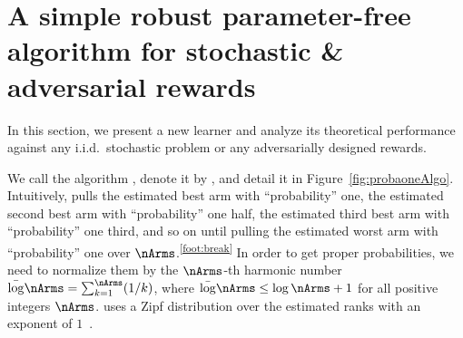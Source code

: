 %
\section{A simple robust parameter-free algorithm for stochastic \& adversarial rewards}
\label{s:UpperBOB}
%
In this section, we present a new learner 
and analyze its theoretical performance against any i.i.d.\, stochastic 
problem or any adversarially designed rewards.

We call the algorithm \ProbabilityONE{}, denote it by \Pone{}, %
and detail it in Figure~\ref{fig:probaoneAlgo}.
Intuitively,  \Pone{} pulls the estimated best arm with 
``probability'' one, the estimated second best arm with ``probability'' 
one half, the estimated third best arm with ``probability'' one 
third, and so on until pulling the estimated worst arm with ``probability'' one over $\nArms$.\textsuperscript{\ref{foot:break}} 
In order to get proper probabilities, we need to normalize  
them by the $\nArms$-th harmonic number %
$\bar\log \nArms =\sum_{k=1}^\nArms (1/k)$, where $\bar\log \nArms\leq \log\nArms+1$ for all positive integers $\nArms$. \Pone{} uses a Zipf distribution over the estimated ranks
with an exponent of $1$~\citep{Powers98AE}.
